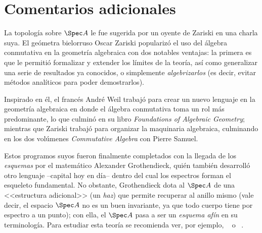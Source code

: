 \documentclass[11pt, reqno]{amsart}
\begin{document}
\begin{enumerate}
\end{enumerate}

\appendix
\section{Comentarios adicionales}
La topología sobre $\Spec A$ le fue sugerida por un oyente de Zariski en una charla suya.
El geómetra bielorruso Oscar Zariski popularizó el uso del álgebra conmutativa en la geometría algebraica con dos
notables ventajas: la primera es que le permitió formalizar y extender los límites de la teoría, así como generalizar
una serie de resultados ya conocidos, o simplemente \emph{algebrizarlos} (es decir, evitar métodos analíticos para poder
demostrarlos).

Inspirado en él, el francés André Weil trabajó para crear un nuevo lenguaje en la geometría algebraica en donde el
álgebra conmutativa toma un rol más predominante, lo que culminó en su libro \emph{Foundations of Algebraic Geometry};
mientras que Zariski trabajó para organizar la maquinaria algebraica, culminando en los dos volúmenes \emph{Commutative
Algebra} con Pierre Samuel.

Estos programos suyos fueron finalmente completados con la llegada de los \emph{esquemas} por el matemático Alexander
Grothendieck, quién también desarrolló otro lenguaje --capital hoy en día-- dentro del cual los espectros forman el
esqueleto fundamental.
No obstante, Grothendieck dota al $\Spec A$ de una <<estructura adicional>> (un \emph{haz}) que permite recuperar al
anillo mismo (vale decir, el espacio $\Spec A$ no es un buen invariante, ya que todo cuerpo tiene por espectro a un
punto); con ella, el $\Spec A$ pasa a ser un \emph{esquema afín} en su terminología.
Para estudiar esta teoría se recomienda ver, por ejemplo, \citeauthor{hartshorne:algebraic}~\cite{hartshorne:algebraic}
o \citeauthor{vakil:rising_sea}~\cite{vakil:rising_sea}.

\printbibliography
\end{document}
